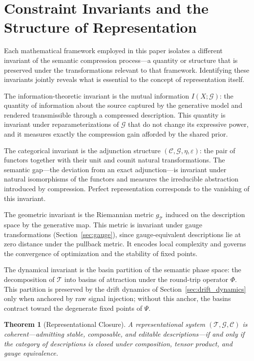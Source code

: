 \documentclass[11pt,a4paper]{article}
\newtheorem{theorem}{Theorem}[section]
\theoremstyle{definition}
\theoremstyle{remark}
\begin{document}
\section{Constraint Invariants and the Structure of Representation}
\label{sec:invariants}

Each mathematical framework employed in this paper isolates a different invariant of the semantic compression process---a quantity or structure that is preserved under the transformations relevant to that framework. Identifying these invariants jointly reveals what is essential to the concept of representation itself.

The information-theoretic invariant is the mutual information $I(X;\mathcal{G})$: the quantity of information about the source captured by the generative model and rendered transmissible through a compressed description. This quantity is invariant under reparameterizations of $\mathcal{G}$ that do not change its expressive power, and it measures exactly the compression gain afforded by the shared prior.

The categorical invariant is the adjunction structure $(\mathcal{C}, \mathcal{G}, \eta, \varepsilon)$: the pair of functors together with their unit and counit natural transformations. The semantic gap---the deviation from an exact adjunction---is invariant under natural isomorphisms of the functors and measures the irreducible abstraction introduced by compression. Perfect representation corresponds to the vanishing of this invariant.

The geometric invariant is the Riemannian metric $g_\mathcal{T}$ induced on the description space by the generative map. This metric is invariant under gauge transformations (Section~\ref{sec:gauge}), since gauge-equivalent descriptions lie at zero distance under the pullback metric. It encodes local complexity and governs the convergence of optimization and the stability of fixed points.

The dynamical invariant is the basin partition of the semantic phase space: the decomposition of $\mathcal{T}$ into basins of attraction under the round-trip operator $\Phi$. This partition is preserved by the drift dynamics of Section~\ref{sec:drift_dynamics} only when anchored by raw signal injection; without this anchor, the basins contract toward the degenerate fixed points of $\Psi$.

\begin{theorem}[Representational Closure]
\label{thm:closure}
A representational system $(\mathcal{T}, \mathcal{G}, \mathcal{C})$ is coherent---admitting stable, composable, and editable descriptions---if and only if the category of descriptions is closed under composition, tensor product, and gauge equivalence.
\end{theorem}
\end{document}
